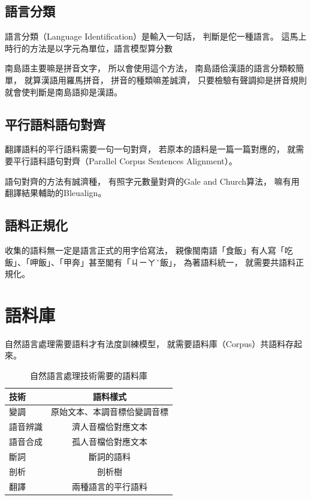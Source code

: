 \subsection{語言分類}
\label{小節：語言分類}
語言分類（Language Identification）是輸入一句話，
判斷是佗一種語言。
這馬上時行的方法是以字元為單位，語言模型算分數\cite{cavnar1994n}

南島語主要嘛是拼音文字，
所以會使用這个方法，
南島語佮漢語的語言分類較簡單，
就算漢語用羅馬拼音，
拼音的種類嘛差誠濟，
只要檢驗有聲調抑是拼音規則就會使判斷是南島語抑是漢語。

\subsection{平行語料語句對齊}
\label{小節：語句對齊}
翻譯語料的平行語料需要一句一句對齊，
若原本的語料是一篇一篇對應的，
就需要平行語料語句對齊（Parallel Corpus Sentences Alignment）。

語句對齊的方法有誠濟種，
有照字元數量對齊的Gale and Church算法\cite{gale1993program}，
嘛有用翻譯結果輔助的Bleualign\cite{zora38464}。

\subsection{語料正規化}
\label{小節：語料正規化}
收集的語料無一定是語言正式的用字佮寫法，
親像閩南語「食飯」有人寫「吃飯」、「呷飯」、「甲奔」甚至閣有「ㄐㄧㄚˇ飯」，
為著語料統一，
就需要共語料正規化\cite{yang2013log}\cite{ling2013paraphrasing}。

\section{語料庫}
\label{節：語料庫}
自然語言處理需要語料才有法度訓練模型，
就需要語料庫（Corpus）共語料存起來。

\begin{table}
\caption{自然語言處理技術需要的語料庫}
\label{表：自然語言處理技術需要的語料庫}
\centering
\begin{tabular}{l|c}
技術 & 語料樣式 \\
\hline
變調 & 原始文本、本調音標佮變調音標 \\
語音辨識 & 濟人音檔佮對應文本 \\
語音合成 & 孤人音檔佮對應文本 \\
斷詞 & 斷詞的語料 \\
剖析 & 剖析樹 \\
翻譯 & 兩種語言的平行語料 \\
\end{tabular}
\end{table}

